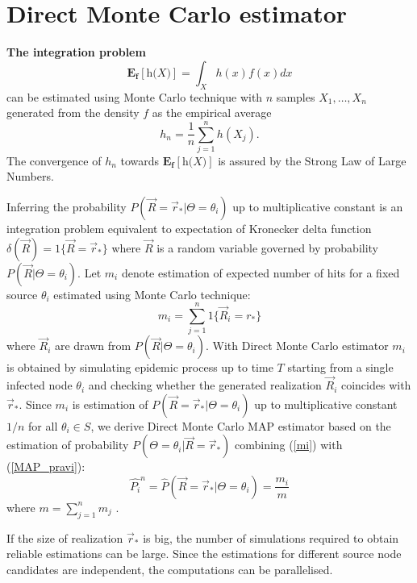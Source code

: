 \documentclass[times, utf8, diplomski]{fer}
\begin{document}
\section{Direct Monte Carlo estimator}

\textbf{The integration problem}
\begin{equation}
\mathbf{E_f[\textit{h(X)}]} = \int_{X} h(x) f(x) dx
\label{exp}
\end{equation} can be estimated using Monte Carlo technique with $n$ samples $X_1, \ldots, X_n$ generated from the density $f$ as the empirical average 
\begin{equation}
h_n = \frac{1}{n} \sum_{j = 1}^{n} h(X_j).
\end{equation}
The convergence of $h_n$ towards $\mathbf{E_f[\textit{h(X)}]}$ is assured by the Strong Law of Large Numbers.

Inferring the probability  $P(\vec R = \vec r_* | \Theta = \theta_i)$ up to multiplicative constant is an integration problem equivalent to expectation of Kronecker delta function
 $\delta(\vec R) = 1\{\vec R = \vec r_{*}\}$ where $\vec R$ is a random variable governed by probability $P(\vec R  | \Theta = \theta_i)$. 
 Let $m_i$ denote estimation of expected number of hits for a fixed source $\theta_i$ estimated using Monte Carlo technique:
\begin{equation}
 m_i = \sum_{j = 1}^{n} 1\{\vec R_i = r_{*}\}
\label{mi}
\end{equation}
where $\vec R_i$ are drawn from $P(\vec R | \Theta = \theta_i)$. With Direct Monte Carlo estimator $m_i$ is obtained by simulating epidemic process up to time $T$ starting from a single infected node $\theta_i$ and checking whether the generated realization $\vec R_i$ coincides with $\vec r_*$. Since $m_i$ is estimation of $P(\vec R = \vec r_* | \Theta = \theta_i)$ up to multiplicative constant $1/n$ for all $\theta_i \in S$, we derive Direct Monte Carlo MAP estimator based on the estimation of probability $P(\Theta = \theta_i | \vec R = \vec r_*)$ combining (\ref{mi}) with (\ref{MAP_pravi}): 
\begin{equation}
\hat{P_i}^n = \hat{P}(\vec R = \vec r_* | \Theta = \theta_i) = \frac{m_i}{m}
\end{equation}
where $m = \sum_{j = 1}^{n} m_j$ .

If the size of realization $\vec r_*$ is big, the number of simulations required to obtain reliable estimations can be large. Since the estimations for different source node candidates are independent, the computations can be parallelised.  
\end{document}
